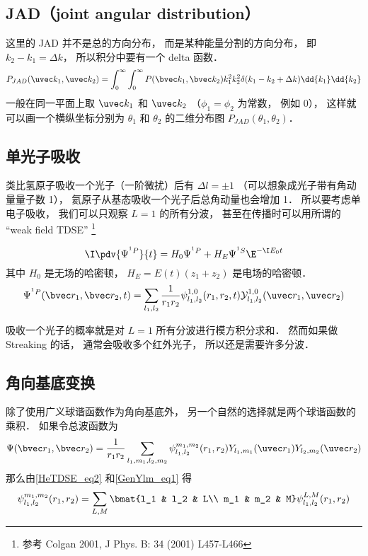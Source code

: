 \subsection{JAD（joint angular distribution）}
这里的 JAD 并不是总的方向分布， 而是某种能量分割的方向分布， 即 $k_2 - k_1 = \Delta k$， 所以积分中要有一个 delta 函数．
\begin{equation}
P_{JAD}(\uvec k_1, \uvec k_2) = \int_0^\infty \int_0^\infty P(\bvec k_1, \bvec k_2) k_1^2 k_2^2 \delta(k_1 - k_2 + \Delta k) \dd{k_1} \dd{k_2}
\end{equation}
一般在同一平面上取 $\uvec k_1$ 和 $\uvec k_2$ （$\phi_1 = \phi_2$ 为常数， 例如 0）， 这样就可以画一个横纵坐标分别为 $\theta_1$ 和 $\theta_2$ 的二维分布图 $P_{JAD}(\theta_1, \theta_2)$．

\subsection{单光子吸收}

类比氢原子吸收一个光子（一阶微扰）后有 $\Delta l = \pm 1$ （可以想象成光子带有角动量量子数 1）， 氦原子从基态吸收一个光子后总角动量也会增加 1． 所以要考虑单电子吸收， 我们可以只观察 $L = 1$ 的所有分波， 甚至在传播时可以用所谓的 “weak field TDSE” \footnote{参考 Colgan 2001, J Phys. B: 34 (2001) L457-L466}

\begin{equation}
\I \pdv{\Psi^{^1P}}{t} = H_0 \Psi^{^1P} + H_E \Psi^{^1S} \E^{-\I E_0 t}
\end{equation}
其中 $H_0$ 是无场的哈密顿， $H_E = E(t) (z_1 + z_2)$ 是电场的哈密顿．
\begin{equation}
\Psi^{^1P}(\bvec r_1, \bvec r_2, t) = \sum_{l_1, l_2} \frac{1}{r_1 r_2} \psi_{l_1, l_2}^{1, 0} (r_1, r_2, t) \mathcal Y_{l_1, l_2}^{1, 0} (\uvec r_1, \uvec r_2)
\end{equation}

吸收一个光子的概率就是对 $L = 1$ 所有分波进行模方积分求和． 然而如果做 Streaking 的话， 通常会吸收多个红外光子， 所以还是需要许多分波．

\subsection{角向基底变换}
除了使用广义球谐函数作为角向基底外， 另一个自然的选择就是两个球谐函数的乘积． 如果令总波函数为
\begin{equation}\label{HeAnal_eq6}
\Psi(\bvec r_1, \bvec r_2) = \frac{1}{r_1 r_2} \sum_{l_1, m_1, l_2, m_2} \psi_{l_1, l_2}^{m_1, m_2}(r_1, r_2) Y_{l_1, m_1}(\uvec r_1) Y_{l_2, m_2} (\uvec r_2)
\end{equation}
那么由\autoref{HeTDSE_eq2} 和\autoref{GenYlm_eq1} 得
\begin{equation}\label{HeAnal_eq7}
\psi_{l_1, l_2}^{m_1, m_2}(r_1, r_2) = \sum_{L,M} \bmat{l_1 & l_2 & L\\ m_1 & m_2 & M} \psi_{l_1, l_2}^{L,M}(r_1, r_2)
\end{equation}

